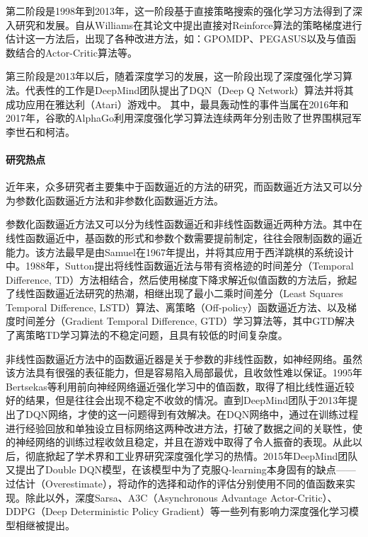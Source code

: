 第二阶段是1998年到2013年，这一阶段基于直接策略搜索的强化学习方法得到了深入研究和发展。自从Williams在其论文\citep{williams1992simple}中提出直接对Reinforce算法的策略梯度进行估计这一方法后，出现了各种改进方法，如：GPOMDP\citep{baxter2001infinite}、PEGASUS\citep{neumann2005reinforcement}以及与值函数结合的Actor-Critic算法\citep{konda2000actor}等。

第三阶段是2013年以后，随着深度学习的发展，这一阶段出现了深度强化学习算法。代表性的工作是DeepMind团队提出了DQN（Deep Q Network）算法并将其成功应用在雅达利（Atari）游戏中\citep{mnih2013playing}。
其中，最具轰动性的事件当属在2016年和2017年，谷歌的AlphaGo利用深度强化学习算法连续两年分别击败了世界围棋冠军李世石和柯洁。
\paragraph{研究热点}


近年来，众多研究者主要集中于函数逼近的方法的研究，而函数逼近方法又可以分为参数化函数逼近方法和非参数化函数逼近方法。

参数化函数逼近方法又可以分为线性函数逼近和非线性函数逼近两种方法。其中在线性函数逼近中，基函数的形式和参数个数需要提前制定，往往会限制函数的逼近能力。该方法最早是由Samuel在1967年提出，并将其应用于西洋跳棋的系统设计中\citep{samuel1959some}。1988年，Sutton提出将线性函数逼近法与带有资格迹的时间差分（Temporal Difference, TD）方法相结合，然后使用梯度下降求解近似值函数的方法后\citep{sutton1988learning}，掀起了线性函数逼近法研究的热潮，相继出现了最小二乘时间差分（Least Squares Temporal Difference, LSTD）算法\citep{bradtke1996linear}、离策略（Off-policy）函数逼近方法\citep{precup2001off}、以及梯度时间差分（Gradient Temporal Difference, GTD）学习算法\citep{sutton2009convergent}等，其中GTD解决了离策略TD学习算法的不稳定问题，且具有较低的时间复杂度\citep{sutton2009convergent}。

非线性函数逼近方法中的函数逼近器是关于参数的非线性函数，如神经网络。虽然该方法具有很强的表征能力，但是容易陷入局部最优，且收敛性难以保证。1995年Bertsekas等\citep{bertsekas1995neuro}利用前向神经网络逼近强化学习中的值函数，取得了相比线性逼近较好的结果，但是往往会出现不稳定不收敛的情况。直到DeepMind团队于2013年提出了DQN网络，才使的这一问题得到有效解决。在DQN网络中，通过在训练过程进行经验回放\citep{mnih2013playing}和单独设立目标网络\citep{mnih2015human}这两种改进方法，打破了数据之间的关联性，使的神经网络的训练过程收敛且稳定，并且在游戏中取得了令人振奋的表现。从此以后，彻底掀起了学术界和工业界研究深度强化学习的热情。2015年DeepMind团队又提出了Double DQN模型，在该模型中为了克服Q-learning本身固有的缺点——过估计（Overestimate），将动作的选择和动作的评估分别使用不同的值函数来实现。除此以外，深度Sarsa、A3C（Asynchronous Advantage Actor-Critic）、DDPG（Deep Deterministic Policy Gradient）等一些列有影响力深度强化学习模型相继被提出。

